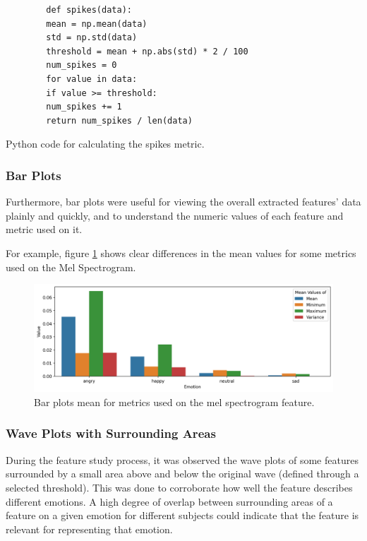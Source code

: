 \begin{listing}[H]
	\begin{verbatim}
		def spikes(data):
		mean = np.mean(data)
		std = np.std(data)
		threshold = mean + np.abs(std) * 2 / 100
		num_spikes = 0
		for value in data:
		if value >= threshold:
		num_spikes += 1
		return num_spikes / len(data)
	\end{verbatim}
	\caption{Python code for calculating the spikes metric.}
	\label{spikes:code}
\end{listing}



\subsubsection{Bar Plots}

Furthermore, bar plots were useful for viewing the overall extracted features' data plainly and quickly, and to understand the numeric values of each feature and metric used on it.

For example, figure \ref{fig:melBarPlot} shows clear differences in the mean values for some metrics used on the Mel Spectrogram.

\begin{figure}[H]
	\centering
	\includegraphics[width=\textwidth]{figs/4_1_traditional/meanFeatBarPlot.png}
	\caption{Bar plots mean for metrics used on the mel spectrogram feature.}
	\label{fig:melBarPlot}
\end{figure}


\subsubsection{Wave Plots with Surrounding Areas}

During the feature study process, it was observed the wave plots of some features surrounded by a small area above and below the original wave (defined through a selected threshold). This was done to corroborate how well the feature describes different emotions. A high degree of overlap between surrounding areas of a feature on a given emotion for different subjects could indicate that the feature is relevant for representing that emotion.

